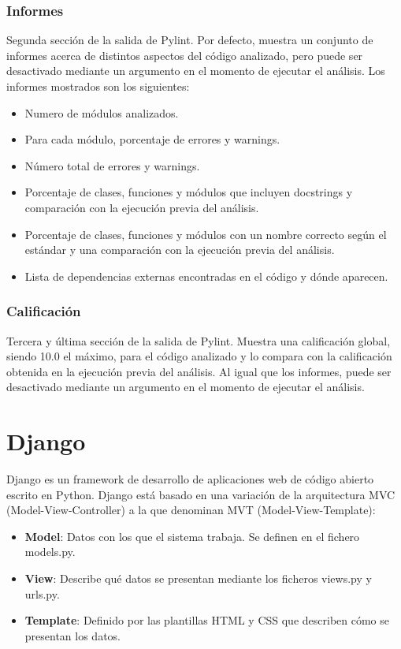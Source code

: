 \documentclass[a4paper, 12pt]{book}
\begin{document}
\subsubsection{Informes}

Segunda sección de la salida de Pylint. 
Por defecto, muestra un conjunto de informes acerca de distintos aspectos del código analizado, pero puede ser desactivado mediante un argumento en el momento de ejecutar el análisis.
Los informes mostrados son los siguientes:
\begin{itemize}
	\item Numero de módulos analizados.
	\item Para cada módulo, porcentaje de errores y warnings.
	\item Número total de errores y warnings.
	\item Porcentaje de clases, funciones y módulos que incluyen docstrings y comparación con la ejecución previa del análisis.
	\item Porcentaje de clases, funciones y módulos con un nombre correcto según el estándar y una comparación con la ejecución previa del análisis.
	\item Lista de dependencias externas encontradas en el código y dónde aparecen.
\end{itemize}

\subsubsection{Calificación}

Tercera y última sección de la salida de Pylint.
Muestra una calificación global, siendo 10.0 el máximo, para el código analizado y lo compara con la calificación obtenida en la ejecución previa del análisis.
Al igual que los informes, puede ser desactivado mediante un argumento en el momento de ejecutar el análisis.

\section{Django} 
\label{sec:django}
Django\cite{django} es un framework de desarrollo de aplicaciones web de código abierto escrito en Python. Django está basado en una variación de la arquitectura MVC (Model-View-Controller) a la que denominan MVT (Model-View-Template):
\begin{itemize}
	\item \textbf{Model}: Datos con los que el sistema trabaja. Se definen en el fichero models.py.
	\item \textbf{View}: Describe qué datos se presentan mediante los ficheros views.py y urls.py. 
	\item \textbf{Template}: Definido por las plantillas HTML y CSS que describen cómo se presentan los datos.
\end{itemize}
\end{document}
